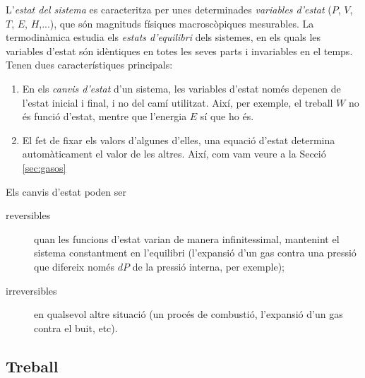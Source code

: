 L'\textit{estat del sistema} es caracteritza  per unes determinades \textit{variables d'estat} ($P$, $V$, $T$, $E$, $H$,...), que són magnituds físiques macroscòpiques mesurables. La termodinàmica estudia els \textit{estats d'equilibri} dels sistemes, en els quals les variables d'estat són idèntiques en totes les seves parts i invariables en el temps.
Tenen dues característiques principals:
\begin{enumerate}
\item En els \textit{canvis d'estat} d'un sistema, les variables d'estat només depenen de l'estat inicial i final, i no del camí utilitzat. Així, per exemple, el treball $W$ no és funció d'estat, mentre que l'energia $E$ sí que ho és.
\item El fet de fixar els valors d'algunes d'elles, una equació d'estat determina automàticament el valor de les altres. Així, com vam veure a la Secció \ref{sec:gasos}
\end{enumerate}

Els canvis d'estat poden ser 
\begin{description}
\item[reversibles] quan les funcions d'estat varian de manera infinitessimal, mantenint el sistema constantment en l'equilibri (l'expansió d'un gas contra una pressió que difereix només $dP$ de la pressió interna, per exemple);
\item[irreversibles] en qualsevol altre situació (un procés de combustió, l'expansió d'un gas contra el buit, etc).
\end{description}


\subsection{Treball}

